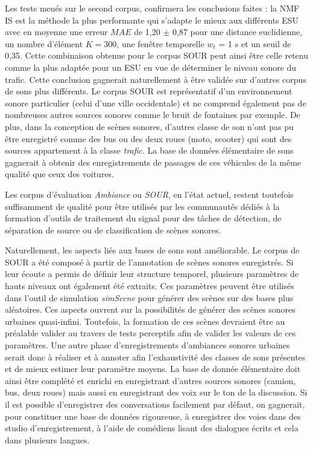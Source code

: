 Les tests menés sur le second corpus, confirmera les conclusions faites : la NMF IS est la méthode la plus performante qui s'adapte le mieux aux différents ESU avec en moyenne une erreur $MAE$ de 1,20 $\pm$ 0,87 pour une distance euclidienne, un nombre d'élément $K = 300$, une fenêtre temporelle $w_t$ = 1 s et un seuil de 0,35. Cette combinaison obtenue pour le corpus SOUR peut ainsi être celle retenu comme la plus adaptée pour un ESU en vue de déterminer le niveau sonore du trafic.
Cette conclusion gagnerait naturellement à être validée sur d'autres corpus de sons plus différents. Le corpus SOUR est  représentatif d'un environnement sonore particulier (celui d'une ville occidentale) et ne comprend également pas de nombreuses autres sources sonores comme le bruit de fontaines par exemple. De plus, dans la conception de scènes sonores, d'autres classe de son n'ont pas pu être enregistré comme des bus ou des deux roues (moto, scooter) qui sont des sources appartement à la classe \textit{trafic}. La base de données élémentaire de sons gagnerait à obtenir des enregistrements de passages de ces véhicules de la même qualité que ceux des voitures.

Les corpus d'évaluation \textit{Ambiance} ou \textit{SOUR}, en l'état actuel, restent toutefois suffisamment de qualité pour être utilisés par les communautés dédiés à la formation d'outils de traitement du signal pour des tâches de détection, de séparation de source ou de classification de scènes sonores.


Naturellement, les aspects liés aux bases de sons sont  améliorable. Le corpus de SOUR a été composé à partir de l'annotation de scènes sonores enregistrés. Si leur écoute a permis de définir leur structure temporel, plusieurs paramètres de hauts niveaux ont également été extraits. Ces paramètres peuvent être utilisés dans l'outil de simulation \textit{simScene} pour générer des scènes sur des bases plus aléatoires. Ces aspects ouvrent sur la possibilités de générer des scènes sonores urbaines quasi-infini. Toutefois, la formation de ces scènes devraient être au préalable valider au travers de tests perceptifs afin de valider les valeurs de ces paramètres.
Une autre phase d'enregistrements d'ambiances sonores urbaines serait donc à réaliser et à annoter afin l'exhaustivité des classes de sons présentes et de mieux estimer leur paramètre moyens.
La base de donnée élémentaire doit ainsi être complété et enrichi en enregistrant d'autres sources sonores (camion, bus, deux roues) mais aussi en enregistrant des voix sur le ton de la discussion. Si il est possible d'enregistrer des conversations facilement par défaut, on gagnerait, pour constituer une base de données rigoureuse, à enregistrer des voies dans des studio d'enregistrement, à l'aide de comédiens lisant des dialogues écrits et cela dans plusieurs langues.

